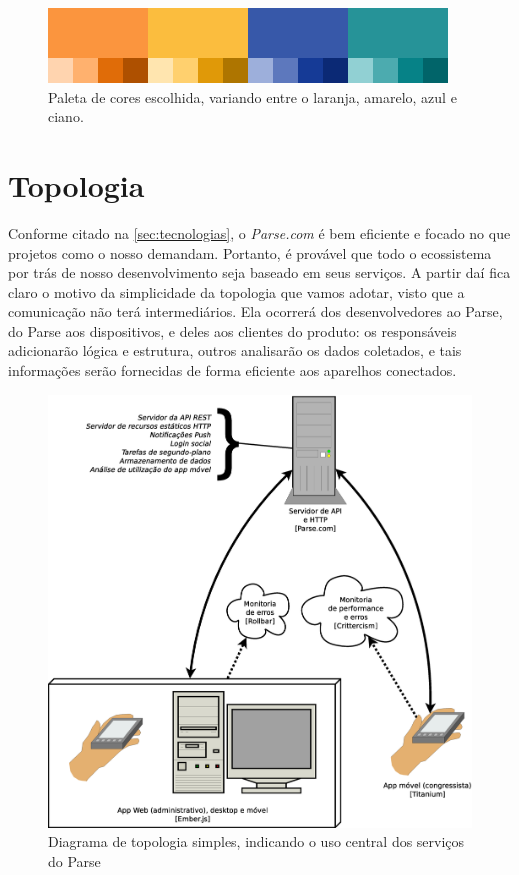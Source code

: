 \documentclass[12pt,a4paper,twoside,hyphens,english,brazil]{abntex2}
\begin{document}
{\begin{figure}[h!]
\centering
	\includegraphics[width=0.6\linewidth]{imagens/paleta.png}
	\caption{Paleta de cores escolhida, variando entre o laranja, amarelo, azul e ciano.}
\end{figure}

\section{Topologia}
Conforme citado na \autoref{sec:tecnologias}, o \emph{Parse.com} é bem eficiente e focado no que projetos como o nosso demandam. Portanto, é provável que todo o ecossistema por trás de nosso desenvolvimento seja baseado em seus serviços. A partir daí fica claro o motivo da simplicidade da topologia que vamos adotar, visto que a comunicação não terá intermediários. Ela ocorrerá dos desenvolvedores ao Parse, do Parse aos dispositivos, e deles aos clientes do produto: os responsáveis adicionarão lógica e estrutura, outros analisarão os dados coletados, e tais informações serão fornecidas de forma eficiente aos aparelhos conectados.

\begin{figure}[h!]
\centering
	\includegraphics[width=0.8\linewidth]{diagramas/topologia-parse.eps}
	\caption{Diagrama de topologia simples, indicando o uso central dos serviços do Parse}
\end{figure}


}
\end{document}
